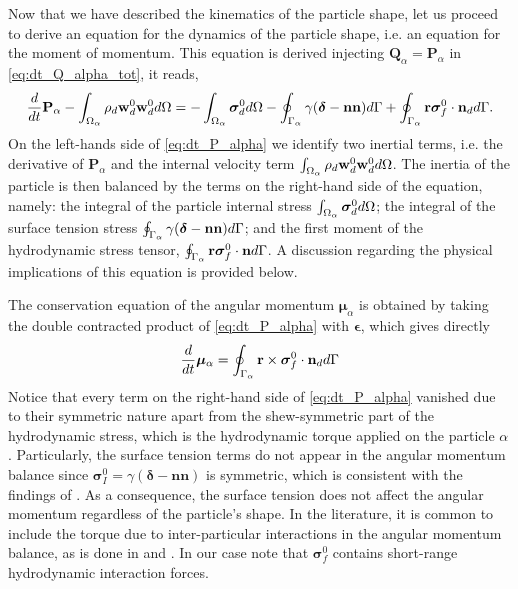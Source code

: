 Now that we have described the kinematics of the particle shape, let us proceed to derive an equation for the dynamics of the particle shape, i.e. an equation for the moment of momentum. 
This equation is derived injecting $\textbf{Q}_\alpha = \textbf{P}_\alpha$ in \ref{eq:dt_Q_alpha_tot}, it reads, 
\begin{equation}
    \frac{d}{dt} {\textbf{P}_\alpha}
    - \int_{\Omega_{\alpha}}  \rho_d  \textbf{w}_d^0 \textbf{w}_d^0  d\Omega
    = 
    - \int_{\Omega_{\alpha}} \bm{\sigma}_d^0 d\Omega
    - \oint_{\Gamma_{\alpha}}  
        \gamma (\bm\delta - \textbf{nn})
     d\Gamma
    + \oint_{\Gamma_{\alpha}}  \textbf{r}\bm{\sigma}_f^0\cdot \textbf{n}_d d\Gamma.
    \label{eq:dt_P_alpha}
\end{equation}
On the left-hands side of \ref{eq:dt_P_alpha} we identify two inertial terms, i.e. the derivative of $\textbf{P}_\alpha$ and the internal velocity term $\int_{\Omega_{\alpha}} \rho_d\textbf{w}_d^0\textbf{w}_d^0  d\Omega$.
The inertia of the particle is then balanced by the terms on the right-hand side of the equation, namely: 
the integral of the particle internal stress $\int_{\Omega_{\alpha}}  \bm{\sigma}_d^0 d\Omega$; 
the integral of the surface tension stress $\oint_{\Gamma_{\alpha}}  \gamma (\bm\delta- \textbf{nn})  d\Gamma$; 
and the first moment of the hydrodynamic stress tensor, $\oint_{\Gamma_{\alpha}} \textbf{r}\bm\sigma_f^0\cdot \textbf{n} d\Gamma$.
A discussion regarding the physical implications of this equation is provided below. 

The conservation equation of the angular momentum $\bm{\mu}_\alpha$ is obtained by taking the double contracted product of \ref{eq:dt_P_alpha} with $\bm\epsilon$, which gives directly
\begin{equation}
    \frac{d}{dt}\bm{\mu}_\alpha
    =  
    \oint_{\Gamma_{\alpha}}  \textbf{r} \times \bm{\sigma}_f^0\cdot \textbf{n}_d  d\Gamma
    \label{eq:dt_mu_alpha}
\end{equation}
Notice that every term on the right-hand side of \ref{eq:dt_P_alpha} vanished due to their symmetric nature apart from the shew-symmetric part of the hydrodynamic stress, which is the hydrodynamic torque applied on the particle $\alpha$.
Particularly, the surface tension terms do not appear in the angular momentum balance since $\bm\sigma_I^0 = \gamma (\bm\delta-\textbf{nn})$ is symmetric, which is consistent with the findings of \citet{hesla1993note}. 
As a consequence, the surface tension does not affect the angular momentum regardless of the particle's shape. 
In the literature, it is common to include the torque due to inter-particular interactions in the angular momentum balance, as is done in \citet{jackson1997locally} and \citet{zhang1997momentum}.
In our case note that $\bm{\sigma}_f^0$ contains short-range hydrodynamic interaction forces. %

